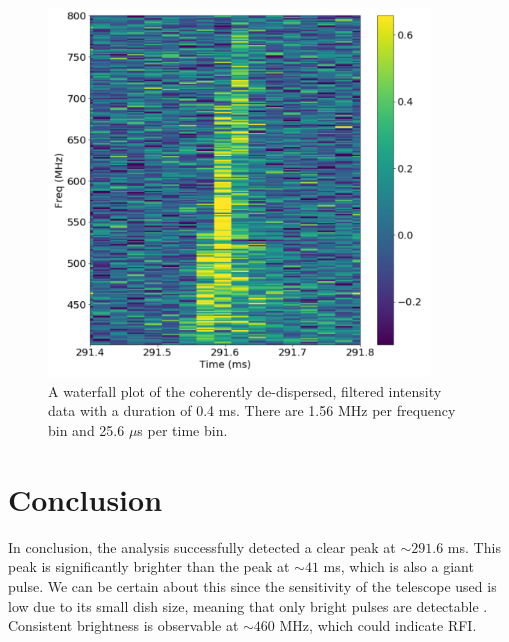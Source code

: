 \documentclass{article}
\begin{document}
\begin{figure}[H]
  \centering
  \includegraphics[width=0.9\textwidth]{wf_400mis.pdf}
  \caption{A waterfall plot of the coherently de-dispersed, filtered intensity data with a duration of 0.4 ms. There are 1.56 MHz per frequency bin and 25.6 $\mu$s per time bin.}
\end{figure}

\section{Conclusion}
In conclusion, the analysis successfully detected a clear peak at $\sim 291.6$ ms. This peak is significantly brighter than the peak at $\sim 41$ ms, which is also a giant pulse. We can be certain about this since the sensitivity of the telescope used is low due to its small dish size, meaning that only bright pulses are detectable \cite{2012hpa..book.....L}. Consistent brightness is observable at $\sim 460$ MHz, which could indicate RFI.

\printbibliography
\end{document}
